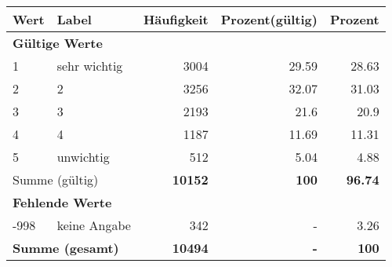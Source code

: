      \begin{longtable}{lXrrr}
     \toprule
     \textbf{Wert} & \textbf{Label} & \textbf{Häufigkeit} & \textbf{Prozent(gültig)} & \textbf{Prozent} \\
     \endhead
     \midrule
     \multicolumn{5}{l}{\textbf{Gültige Werte}}\\

     1 &
     \multicolumn{1}{X}{ sehr wichtig   } &


       \num{3004} &
       \num[round-mode=places,round-precision=2]{29,59} &
         \num[round-mode=places,round-precision=2]{28,63} \\

     2 &
     \multicolumn{1}{X}{ 2   } &


       \num{3256} &
       \num[round-mode=places,round-precision=2]{32,07} &
         \num[round-mode=places,round-precision=2]{31,03} \\

     3 &
     \multicolumn{1}{X}{ 3   } &


       \num{2193} &
       \num[round-mode=places,round-precision=2]{21,6} &
         \num[round-mode=places,round-precision=2]{20,9} \\

     4 &
     \multicolumn{1}{X}{ 4   } &


       \num{1187} &
       \num[round-mode=places,round-precision=2]{11,69} &
         \num[round-mode=places,round-precision=2]{11,31} \\

     5 &
     \multicolumn{1}{X}{ unwichtig   } &


       \num{512} &
       \num[round-mode=places,round-precision=2]{5,04} &
         \num[round-mode=places,round-precision=2]{4,88} \\
     \midrule
     \multicolumn{2}{l}{Summe (gültig)} &
       \textbf{\num{10152}} &
     \textbf{100} &
       \textbf{\num[round-mode=places,round-precision=2]{96,74}} \\
     \multicolumn{5}{l}{\textbf{Fehlende Werte}}\\
       -998 &
       keine Angabe &
         \num{342} &
        - &
         \num[round-mode=places,round-precision=2]{3,26} \\
     \midrule
     \multicolumn{2}{l}{\textbf{Summe (gesamt)}} &
          \textbf{\num{10494}} &
        \textbf{-} &
        \textbf{100} \\
     \bottomrule
     \end{longtable}
     
